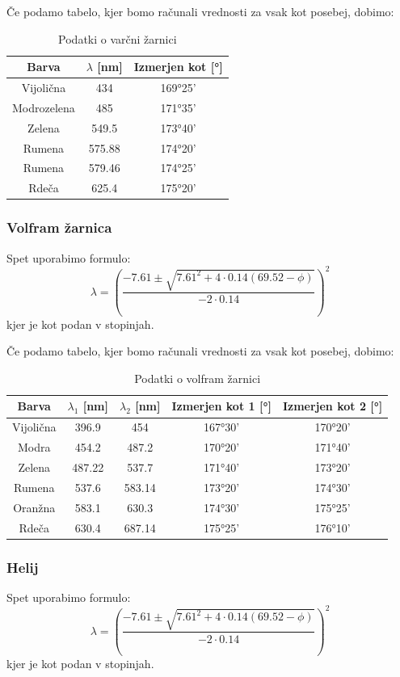 \documentclass[11pt, a4paper]{article}
\theoremstyle{definition}
\theoremstyle{example}
\theoremstyle{izrek}
\begin{document}
Če podamo tabelo, kjer bomo računali vrednosti za vsak kot posebej, dobimo:
\begin{table}[H]
	\centering
	\begin{tabular}{|c|c|c|}
		\hline
		Barva &  $\lambda$ [nm] & Izmerjen kot [°] \\
		\hline
		\hline
		Vijolična  & 434 & 169°25' \\
		\hline
		Modrozelena  & 485 & 171°35' \\
		\hline
		Zelena & 549.5 & 173°40'\\
		\hline
		Rumena & 575.88& 174°20'\\  
		\hline
		Rumena & 579.46 & 174°25'\\  
		\hline
		Rdeča & 625.4 & 175°20' \\  
		\hline
		\hline
	\end{tabular}
	\caption{Podatki o varčni žarnici}	
\end{table}
\subsubsection{Volfram žarnica}
Spet uporabimo formulo:
$$\lambda=\left(\frac{-7.61 \pm\sqrt{7.61^2+4 \cdot 0.14(69.52-\phi)}}{-2 \cdot 0.14}\right)^2$$
kjer je kot podan v stopinjah.

Če podamo tabelo, kjer bomo računali vrednosti za vsak kot posebej, dobimo:
\begin{table}[H]
	\centering
	\begin{tabular}{|c|c|c|c|c|}
		\hline
		Barva &  $\lambda_1$ [nm]&  $\lambda_2$ [nm] & Izmerjen kot 1 [°] & Izmerjen kot 2 [°]\\
		\hline
		\hline
		Vijolična  & 396.9 & 454& 167°30'	&170°20' \\
		\hline
		Modra  & 454.2 & 487.2& 170°20'& 171°40' \\
		\hline
		Zelena & 487.22 & 537.7 & 171°40'	& 173°20'\\
		\hline
		Rumena & 537.6 & 583.14 & 173°20'	& 174°30'\\  
		\hline
		Oranžna & 583.1 & 630.3 & 174°30'	& 175°25' \\  
		\hline
		Rdeča & 630.4 & 687.14 & 175°25'	& 176°10' \\  
		\hline
		\hline
	\end{tabular}
	\caption{Podatki o volfram žarnici}	
\end{table}
\pagebreak
\subsubsection{Helij}
Spet uporabimo formulo:
$$\lambda=\left(\frac{-7.61 \pm\sqrt{7.61^2+4 \cdot 0.14(69.52-\phi)}}{-2 \cdot 0.14}\right)^2$$
kjer je kot podan v stopinjah.
\end{document}
